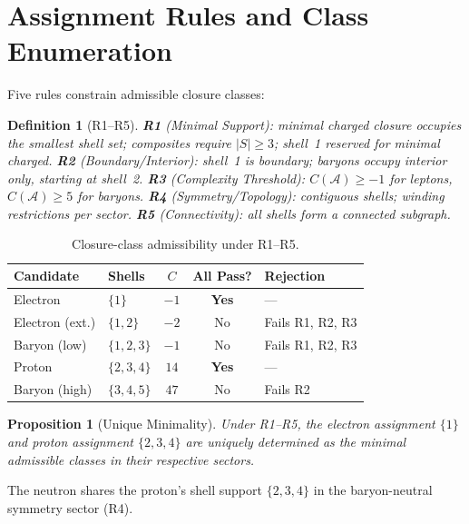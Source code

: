 \documentclass[12pt]{article}
\newtheorem{proposition}[theorem]{Proposition}
\newtheorem{definition}[theorem]{Definition}
\newcommand{\Acal}{\mathcal{A}}
\begin{document}
\section{Assignment Rules and Class Enumeration}\label{sec:rules}

Five rules constrain admissible closure classes:

\begin{definition}[R1--R5]
\textbf{R1} (Minimal Support): minimal charged closure occupies the smallest shell set; composites require $|S| \geq 3$; shell~1 reserved for minimal charged.
\textbf{R2} (Boundary/Interior): shell~1 is boundary; baryons occupy interior only, starting at shell~2.
\textbf{R3} (Complexity Threshold): $C(\Acal) \geq -1$ for leptons, $C(\Acal) \geq 5$ for baryons.
\textbf{R4} (Symmetry/Topology): contiguous shells; winding restrictions per sector.
\textbf{R5} (Connectivity): all shells form a connected subgraph.
\end{definition}

\begin{table}[ht]
\centering
\caption{Closure-class admissibility under R1--R5.}
\label{tab:assignments}
\begin{tabular}{@{}llccl@{}}
\toprule
Candidate & Shells & $C$ & All Pass? & Rejection \\
\midrule
Electron & $\{1\}$ & $-1$ & \textbf{Yes} & --- \\
Electron (ext.) & $\{1,2\}$ & $-2$ & No & Fails R1, R2, R3 \\
Baryon (low) & $\{1,2,3\}$ & $-1$ & No & Fails R1, R2, R3 \\
Proton & $\{2,3,4\}$ & $14$ & \textbf{Yes} & --- \\
Baryon (high) & $\{3,4,5\}$ & $47$ & No & Fails R2 \\
\bottomrule
\end{tabular}
\end{table}

\begin{proposition}[Unique Minimality]
Under R1--R5, the electron assignment $\{1\}$ and proton assignment $\{2,3,4\}$ are uniquely determined as the minimal admissible classes in their respective sectors.
\end{proposition}

The neutron shares the proton's shell support $\{2,3,4\}$ in the baryon-neutral symmetry sector (R4).
\end{document}
